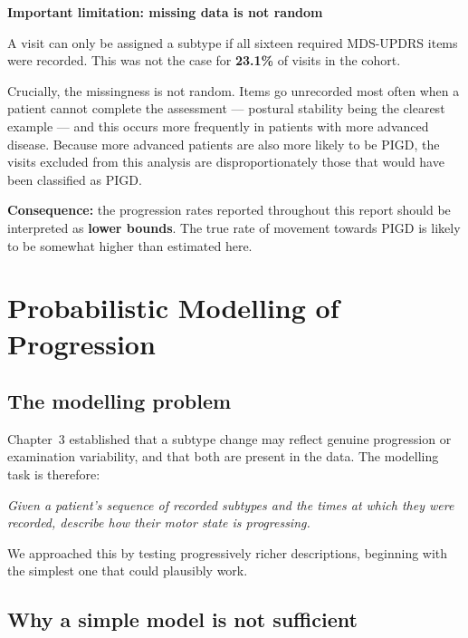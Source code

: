 \documentclass[11pt,a4paper]{article}
\newenvironment{caveat}[1]
  {\begin{lrbox}{\caveatbox}\begin{minipage}{0.90\textwidth}%
   \vspace{2pt}\small\textbf{\color{warn}#1}\par\vspace{4pt}}
  {\vspace{2pt}\end{minipage}\end{lrbox}%
   \begin{center}\fcolorbox{warn}{soft}{\usebox{\caveatbox}}\end{center}\vspace{4pt}}
\begin{document}
\begin{caveat}{Important limitation: missing data is not random}
A visit can only be assigned a subtype if all sixteen required MDS-UPDRS items
were recorded. This was not the case for \textbf{23.1\%} of visits in the
cohort.

Crucially, the missingness is not random. Items go unrecorded most often when a
patient cannot complete the assessment --- postural stability being the clearest
example --- and this occurs more frequently in patients with more advanced
disease. Because more advanced patients are also more likely to be PIGD, the
visits excluded from this analysis are disproportionately those that would have
been classified as PIGD.

\vspace{4pt}
\textbf{Consequence:} the progression rates reported throughout this report
should be interpreted as \textbf{lower bounds}. The true rate of movement
towards PIGD is likely to be somewhat higher than estimated here.
\end{caveat}

\section{Probabilistic Modelling of Progression}

\subsection{The modelling problem}

Chapter~3 established that a subtype change may reflect genuine progression or
examination variability, and that both are present in the data. The modelling
task is therefore:

\begin{center}
\emph{Given a patient's sequence of recorded subtypes and the times at which
they were recorded, describe how their motor state is progressing.}
\end{center}

We approached this by testing progressively richer descriptions, beginning with
the simplest one that could plausibly work.

\subsection{Why a simple model is not sufficient}
\end{document}
